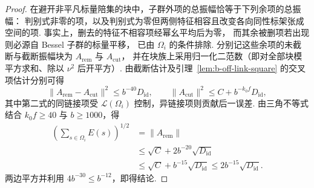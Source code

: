 \begin{proof}
在避开非平凡标量陪集的块中，子群外项的总振幅恰等于下列余项的总振幅：
判别式非零的项，以及判别式为零但两侧特征相容且改变各向同性标架张成空间的项.
事实上，删去的特征不相容项经幂幺平均后为零，
而其余被删项若出现则必源自 Bessel 子群的标量平移，
已由 $\Omega_i$ 的条件排除.
分别记这些余项的未截断与截断振幅块为 $A_{\mathrm{rem}}$ 与 $A_{\mathrm{cut}}$，
并在块族上采用归一化二范数（即对全部块模平方求和、除以 $\nu^2$ 后开平方）.
由截断估计及引理~\ref{lem:b-off-link-square} 的交叉项估计分别可得
\[
 \|A_{\mathrm{rem}}-A_{\mathrm{cut}}\|^2
 \le b^{-40}D_{\mathrm{id}},\qquad
 \|A_{\mathrm{cut}}\|^2\le C+b^{-k_0f}D_{\mathrm{id}},
\]
其中第二式的同链接项受 $\mathcal L(\Omega_i)$ 控制，异链接项则贡献后一误差.
由三角不等式结合 $k_0f\ge40$ 与 $b\ge1000$，得
\[
 \begin{aligned}
 \left(\sum_{s\in\Omega_i}E(s)\right)^{1/2}
 &=\|A_{\mathrm{rem}}\|\\
 &\le \sqrt C+2b^{-20}\sqrt{D_{\mathrm{id}}}\\
 &\le \sqrt C+b^{-15}\sqrt{D_{\mathrm{id}}}
 \le 2b^{-15}\sqrt{D_{\mathrm{id}}}.
 \end{aligned}
\]
两边平方并利用 $4b^{-30}\le b^{-12}$，即得结论.
\end{proof}


